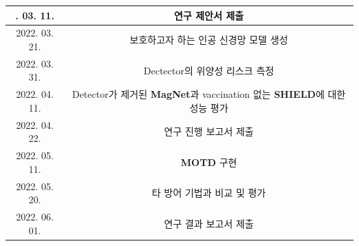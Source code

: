 \documentclass{article}
\begin{document}
\begin{table}[h]
    \centering
    \label{t2}
    \begin{tabular}{c|c}
        \noalign{\smallskip}\noalign{\smallskip}\hline
        2022. 03. 11. & 연구 제안서 제출  \\
        \hline
        2022. 03. 21. & 보호하고자 하는 인공 신경망 모델 생성 \\
        \hline
        2022. 03. 31. & Dectector의 위양성 리스크 측정 \\
        \hline
        2022. 04. 11. & Detector가 제거된 \textbf{MagNet}과 vaccination 없는 \textbf{SHIELD}에 대한 성능 평가 \\
        \hline
        2022. 04. 22. & 연구 진행 보고서 제출  \\
        \hline
        2022. 05. 11. & \textbf{MOTD} 구현 \\
        \hline
        2022. 05. 20. & 타 방어 기법과 비교 및 평가 \\
        \hline
        2022. 06. 01. & 연구 결과 보고서 제출  \\
        \hline
    \end{tabular}
\end{table}



\end{document}
